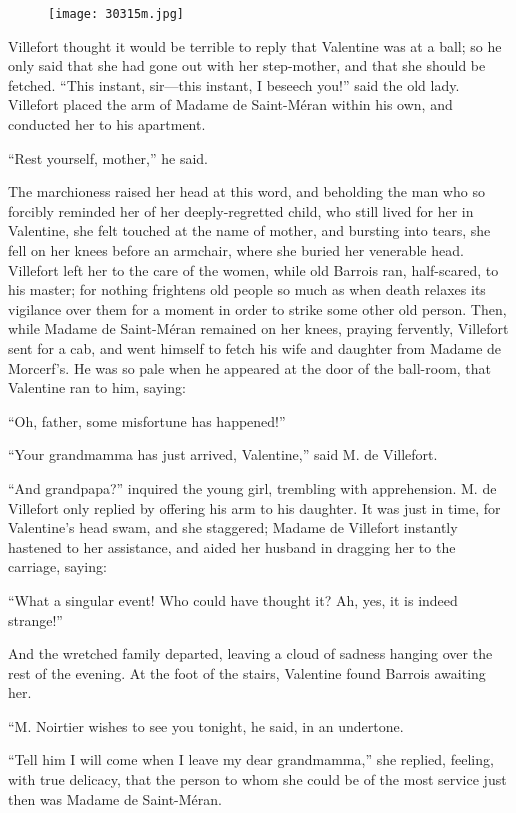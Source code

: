 \begin{figure}[ht]
\texttt{[image: 30315m.jpg]}
\end{figure}

Villefort thought it would be terrible to reply that Valentine was at a
ball; so he only said that she had gone out with her step-mother, and
that she should be fetched. “This instant, sir—this instant, I beseech
you!” said the old lady. Villefort placed the arm of Madame de
Saint-Méran within his own, and conducted her to his apartment.

“Rest yourself, mother,” he said.

The marchioness raised her head at this word, and beholding the man who
so forcibly reminded her of her deeply-regretted child, who still lived
for her in Valentine, she felt touched at the name of mother, and
bursting into tears, she fell on her knees before an armchair, where
she buried her venerable head. Villefort left her to the care of the
women, while old Barrois ran, half-scared, to his master; for nothing
frightens old people so much as when death relaxes its vigilance over
them for a moment in order to strike some other old person. Then, while
Madame de Saint-Méran remained on her knees, praying fervently,
Villefort sent for a cab, and went himself to fetch his wife and
daughter from Madame de Morcerf’s. He was so pale when he appeared at
the door of the ball-room, that Valentine ran to him, saying:

“Oh, father, some misfortune has happened!”

“Your grandmamma has just arrived, Valentine,” said M. de Villefort.

“And grandpapa?” inquired the young girl, trembling with apprehension.
M. de Villefort only replied by offering his arm to his daughter. It
was just in time, for Valentine’s head swam, and she staggered; Madame
de Villefort instantly hastened to her assistance, and aided her
husband in dragging her to the carriage, saying:

“What a singular event! Who could have thought it? Ah, yes, it is
indeed strange!”

And the wretched family departed, leaving a cloud of sadness hanging
over the rest of the evening. At the foot of the stairs, Valentine
found Barrois awaiting her.

“M. Noirtier wishes to see you tonight, he said, in an undertone.

“Tell him I will come when I leave my dear grandmamma,” she replied,
feeling, with true delicacy, that the person to whom she could be of
the most service just then was Madame de Saint-Méran.

